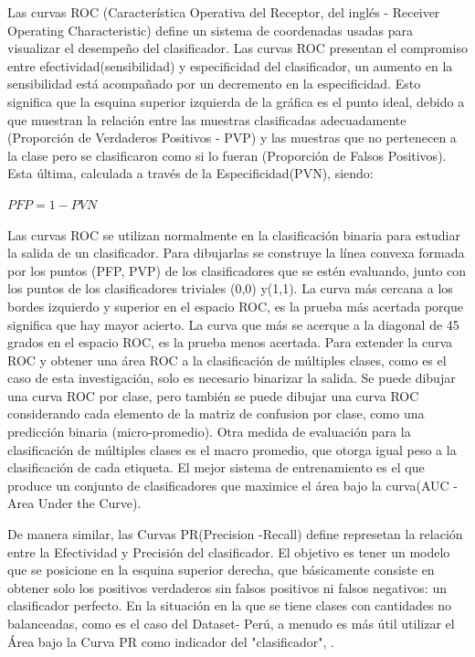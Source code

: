 	
	Las curvas ROC (Característica Operativa del Receptor, del inglés - Receiver Operating Characteristic) define un sistema de coordenadas usadas para visualizar el desempeño del clasificador. Las curvas ROC presentan el compromiso entre efectividad(sensibilidad) y especificidad del clasificador, un aumento en la sensibilidad está acompañado por un decremento en la especificidad. Esto significa que la esquina superior izquierda de la gráfica es el punto ideal, debido a que muestran la relación entre las muestras clasificadas adecuadamente (Proporción de Verdaderos Positivos - PVP) y las muestras que no pertenecen a la clase pero se clasificaron como si lo fueran (Proporción de Falsos Positivos). Esta última, calculada a través de la Especificidad(PVN), siendo:
	\begin{center}
	{$PFP= 1 - PVN$}
	\end{center}

	Las curvas ROC se utilizan normalmente en la clasificación binaria para estudiar la salida de un clasificador. Para dibujarlas se construye la línea convexa formada por los puntos (PFP, PVP) de los clasificadores que se estén evaluando, junto con los puntos de los clasificadores triviales (0,0) y(1,1). La curva más cercana a los bordes izquierdo y superior en el espacio ROC, es la prueba más acertada porque significa que hay mayor acierto. La curva que más se acerque a la diagonal de 45 grados en el espacio ROC, es la prueba menos acertada. Para extender la curva ROC y obtener una área ROC a la clasificación de múltiples clases, como es el caso de esta investigación, solo es necesario binarizar la salida. Se puede dibujar una curva ROC por clase, pero también se puede dibujar una curva ROC considerando cada elemento de la matriz de confusion por clase, como una predicción binaria (micro-promedio). Otra medida de evaluación para la clasificación de múltiples clases es el macro promedio, que otorga igual peso a la clasificación de cada etiqueta. El mejor sistema de entrenamiento es el que produce un conjunto de clasificadores que maximice el área bajo la curva(AUC - Area Under the Curve)\citep{SandovalCereza}.


	De manera similar, las Curvas PR(Precision -Recall) define represetan la relación entre la Efectividad y Precisión del clasificador. El objetivo es tener un modelo que se posicione en la esquina superior derecha, que básicamente consiste en obtener solo los positivos verdaderos sin falsos positivos ni falsos negativos: un clasificador perfecto. En la situación en la que se tiene clases con cantidades no balanceadas, como es el caso del Dataset- Perú, a menudo es más útil utilizar el Área bajo la Curva PR como indicador del "clasificador", \citep{Davis-2006-RPR-1143844-1143874}.


